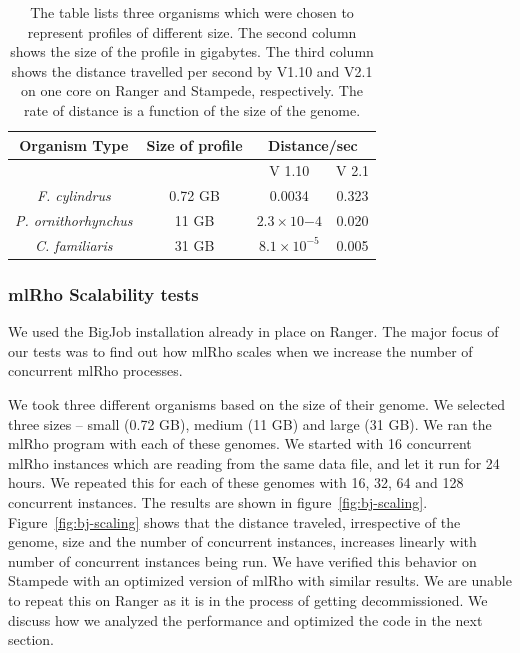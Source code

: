 \documentclass{sig-alternate}
\begin{document}
\begin{table}
\centering
\begin{tabular}{|c|c| c |c  |     } \hline
Organism Type		& Size of profile& \multicolumn{2}{|c|}{Distance/sec}  \\ \hline
	&   & V 1.10 & V 2.1 \\ \hline
{\it F. cylindrus}  & 0.72 GB & 0.0034 & 0.323 \\ \hline
{\it P. ornithorhynchus}  & 11 GB &$2.3{\times}10{-4}$ & 0.020 \\ \hline
{\it C. familiaris}  & 31 GB & $8.1{\times}10^{-5}$ & 0.005 \\
\hline

\end{tabular}
\caption{The table lists three organisms which were chosen to represent profiles of different size. The second column shows the size of the profile in gigabytes. The third column shows the distance travelled per second by V1.10 and V2.1 on one core on Ranger and Stampede, respectively. The rate of distance is a function of the size of the genome.  } 
\label{table:cache_comp}
\end{table}

\subsubsection{mlRho Scalability tests}
\label{sec:scalability}
We used the BigJob installation already in place on Ranger. The major focus of our tests was to find out how mlRho scales when we increase the number of concurrent mlRho processes. 

We took three different organisms based on the size of their genome. We selected three sizes -- small (0.72 GB), medium (11 GB) and large (31 GB). We ran the mlRho program with each of these genomes. We started with 16 concurrent mlRho instances which are reading from the same data file, and let it run for 24 hours. We repeated this for each of these genomes with 16, 32, 64 and 128 concurrent instances. The results are shown in figure~\ref{fig:bj-scaling}. Figure~\ref{fig:bj-scaling} shows that the distance traveled, irrespective of the genome, size and the number of concurrent instances, increases linearly with number of concurrent instances being run. We have verified this behavior on Stampede with an optimized version of mlRho with similar results. We are unable to repeat this on Ranger as it is in the process of getting decommissioned. We discuss how we analyzed the performance and optimized the code in the next section. 
\end{document}
